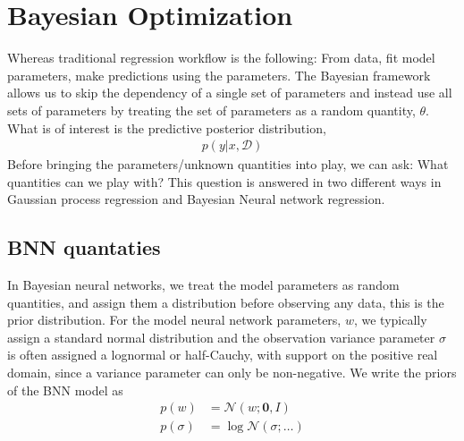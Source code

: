 \section{Bayesian Optimization}
Whereas traditional regression workflow is the following: From data, fit model parameters, make predictions using the parameters. 
The Bayesian framework allows us to skip the dependency of a single set of parameters and instead use all sets of parameters 
by treating the set of parameters as a random quantity, $\theta$. What is of interest is the predictive posterior distribution,  
\begin{align}\label{Predictive2}
    p(y|x, \mathcal{D})
\end{align}
Before bringing the parameters/unknown quantities into play, 
we can ask: What quantities can we play with? This question is answered in two different ways in Gaussian process regression
and Bayesian Neural network regression.

\subsection{BNN quantaties}
In Bayesian neural networks, we treat the model parameters as random quantities, and assign them a distribution
before observing any data, this is the prior distribution. For the model neural network parameters, $w$,
we typically assign a standard normal distribution and the observation variance parameter $\sigma$ is often
assigned a lognormal or half-Cauchy, with support on the positive real domain, since a variance parameter can only
be non-negative. We write the priors of the BNN model as
\begin{align*}
    p(w) &= \mathcal{N}(w;\textbf{0},I)\\
    p(\sigma) &= \log\mathcal{N}(\sigma;\dots)
\end{align*}

